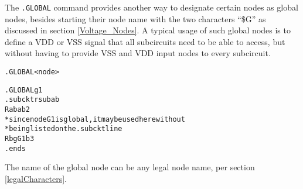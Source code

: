 


\label{GLOBAL_section}

The \texttt{.GLOBAL} command provides another way to designate certain 
nodes as global nodes, besides starting their node name with the two 
characters ``\$G'' as discussed in section \ref{Voltage_Nodes}.  A typical 
usage of such global nodes is to define a VDD or VSS signal that all
subcircuits need to be able to access, but without having to provide 
VSS and VDD input nodes to every subcircuit. 

\begin{Command}

\format
\begin{alltt}
.GLOBAL <node>
\end{alltt}

\examples
\begin{alltt}
.GLOBAL g1
.subckt rsub  a  b
Rab  a  b  2
* since node G1 is global, it may be used here without
* being listed on the .subckt line
Rbg  G1  b  3  
.ends
\end{alltt}

\comments
The name of the global node can be any legal node name, per 
section \ref{legalCharacters}.

\end{Command}

